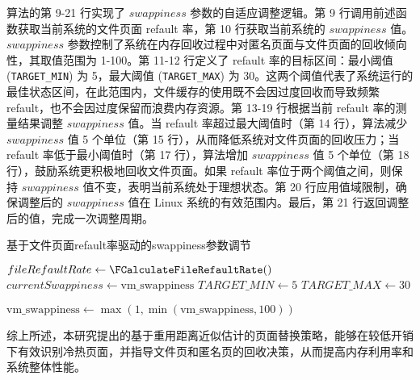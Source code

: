 算法的第 9-21 行实现了 \(swappiness\) 参数的自适应调整逻辑。第 9 行调用前述函数获取当前系统的文件页面 refault 率，第 10 行获取当前系统的 \(swappiness\) 值。\(swappiness\) 参数控制了系统在内存回收过程中对匿名页面与文件页面的回收倾向性，其取值范围为 1-100。第 11-12 行定义了 refault 率的目标区间：最小阈值 (\texttt{TARGET\_MIN}) 为 5，最大阈值 (\texttt{TARGET\_MAX}) 为 30。这两个阈值代表了系统运行的最佳状态区间，在此范围内，文件缓存的使用既不会因过度回收而导致频繁 refault，也不会因过度保留而浪费内存资源。第 13-19 行根据当前 refault 率的测量结果调整 \(swappiness\) 值。当 refault 率超过最大阈值时（第 14 行），算法减少 \(swappiness\) 值 5 个单位（第 15 行），从而降低系统对文件页面的回收压力；当 refault 率低于最小阈值时（第 17 行），算法增加 \(swappiness\) 值 5 个单位（第 18 行），鼓励系统更积极地回收文件页面。如果 refault 率位于两个阈值之间，则保持 \(swappiness\) 值不变，表明当前系统处于理想状态。第 20 行应用值域限制，确保调整后的 \(swappiness\) 值在 Linux 系统的有效范围内。最后，第 21 行返回调整后的值，完成一次调整周期。
\begin{algorithm}[htbp]
  \caption{基于文件页面refault率驱动的swappiness参数调节}
  \label{alg:swappiness1}
  
  
  \(fileRefaultRate \gets \FCalculateFileRefaultRate()\) \;
  \(currentSwappiness \gets \text{vm\_swappiness}\) \;  %
  \(TARGET\_MIN \gets 5\) \;
  \(TARGET\_MAX \gets 30\) \;
  
  \(\text{vm\_swappiness} \gets \max(1, \min(\text{vm\_swappiness}, 100))\) \;
\end{algorithm}

综上所述，本研究提出的基于重用距离近似估计的页面替换策略，能够在较低开销下有效识别冷热页面，并指导文件页和匿名页的回收决策，从而提高内存利用率和系统整体性能。

